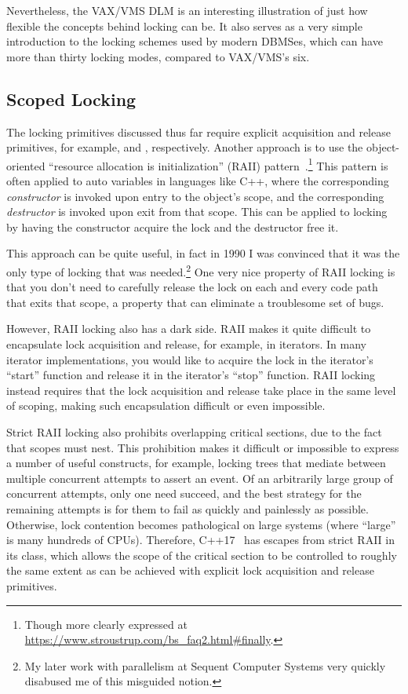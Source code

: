 Nevertheless, the VAX/VMS DLM is an interesting illustration of just
how flexible the concepts behind locking can be.
It also serves as a very simple introduction to the locking schemes
used by modern DBMSes, which can have more than thirty locking modes,
compared to VAX/VMS's six.

\subsection{Scoped Locking}
\label{sec:locking:Scoped Locking}

The locking primitives discussed thus far require explicit acquisition and
release primitives, for example,  and ,
respectively.
Another approach is to use the object-oriented ``resource allocation
is initialization'' (RAII) pattern~\cite{MargaretAEllis1990Cplusplus}.\footnote{
	Though more clearly expressed at
	\url{https://www.stroustrup.com/bs_faq2.html\#finally}.}
This pattern is often applied to auto variables in languages like C++,
where the corresponding \emph{constructor} is invoked upon entry to
the object's scope, and the corresponding \emph{destructor} is invoked
upon exit from that scope.
This can be applied to locking by having the constructor acquire the
lock and the destructor free it.

This approach can be quite useful, in fact in 1990 I was convinced that it
was the only type of locking that was needed.\footnote{
	My later work with parallelism at Sequent Computer Systems very
	quickly disabused me of this misguided notion.}
One very nice property of RAII locking is that you don't need to carefully
release the lock on each and every code path that exits that scope,
a property that can eliminate a troublesome set of bugs.

However, RAII locking also has a dark side.
RAII makes it quite difficult to encapsulate lock acquisition and release,
for example, in iterators.
In many iterator implementations, you would like to acquire the lock in
the iterator's ``start'' function and release it in the iterator's ``stop''
function.
RAII locking instead requires that the lock acquisition and release take
place in the same level of scoping, making such encapsulation difficult or
even impossible.

Strict RAII locking also prohibits overlapping critical sections, due
to the fact that scopes must nest.
This prohibition makes it difficult or impossible to express a number of
useful constructs, for example, locking trees
that mediate between multiple concurrent attempts to assert an event.
Of an arbitrarily large group of concurrent attempts, only one need succeed,
and the best strategy for the remaining attempts is for them to fail as
quickly and painlessly as possible.
Otherwise, lock contention becomes pathological on large systems
(where ``large'' is many hundreds of CPUs).
Therefore, C++17~\cite{RichardSmith2019N4800} has escapes from strict RAII
in its  class, which allows the scope of the critical
section to be controlled to roughly the same extent as can be achieved
with explicit lock acquisition and release primitives.

